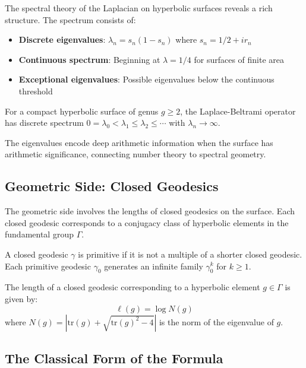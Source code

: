 The spectral theory of the Laplacian on hyperbolic surfaces reveals a rich structure. The spectrum consists of:

\begin{itemize}
\item \textbf{Discrete eigenvalues}: $\lambda_n = s_n(1-s_n)$ where $s_n = 1/2 + ir_n$
\item \textbf{Continuous spectrum}: Beginning at $\lambda = 1/4$ for surfaces of finite area
\item \textbf{Exceptional eigenvalues}: Possible eigenvalues below the continuous threshold
\end{itemize}

\begin{theorem}
\label{thm:selberg_spectral}
For a compact hyperbolic surface of genus $g \geq 2$, the Laplace-Beltrami operator has discrete spectrum $0 = \lambda_0 < \lambda_1 \leq \lambda_2 \leq \cdots$ with $\lambda_n \to \infty$.
\end{theorem}

The eigenvalues encode deep arithmetic information when the surface has arithmetic significance, connecting number theory to spectral geometry.

\subsection{Geometric Side: Closed Geodesics}

The geometric side involves the lengths of closed geodesics on the surface. Each closed geodesic corresponds to a conjugacy class of hyperbolic elements in the fundamental group $\Gamma$.

\begin{definition}
\label{def:primitive_geodesic}
A closed geodesic $\gamma$ is primitive if it is not a multiple of a shorter closed geodesic. Each primitive geodesic $\gamma_0$ generates an infinite family $\gamma_0^k$ for $k \geq 1$.
\end{definition}

The length of a closed geodesic corresponding to a hyperbolic element $g \in \Gamma$ is given by:
$$\ell(g) = \log N(g)$$
where $N(g) = |\mathrm{tr}(g) + \sqrt{\mathrm{tr}(g)^2 - 4}|$ is the norm of the eigenvalue of $g$.

\subsection{The Classical Form of the Formula}

